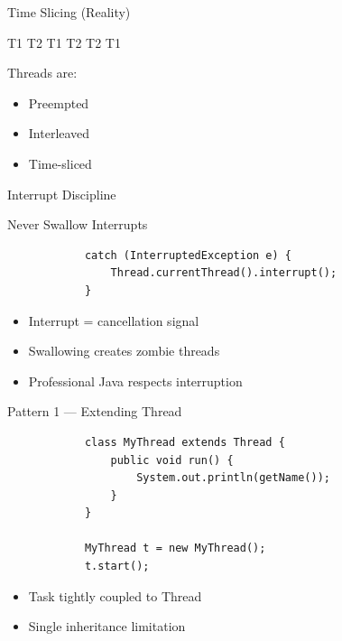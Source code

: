 \documentclass[aspectratio=169,11pt]{beamer}
\begin{document}
	\begin{frame}{Time Slicing (Reality)}
		\begin{center}
			\Huge
			T1 \quad T2 \quad T1 \quad T2 \quad T2 \quad T1
		\end{center}
		
		\vspace{5mm}
		
		Threads are:
		\begin{itemize}
			\item Preempted
			\item Interleaved
			\item Time-sliced
		\end{itemize}
	\end{frame}
	
	\begin{frame}[fragile]{Interrupt Discipline}
		\begin{block}{Never Swallow Interrupts}
		\end{block}
		
		\begin{lstlisting}
			catch (InterruptedException e) {
				Thread.currentThread().interrupt();
			}
		\end{lstlisting}
		
		\begin{itemize}
			\item Interrupt = cancellation signal
			\item Swallowing creates zombie threads
			\item Professional Java respects interruption
		\end{itemize}
	\end{frame}
	
	\begin{frame}[fragile]{Pattern 1 — Extending Thread}
		\begin{lstlisting}
			class MyThread extends Thread {
				public void run() {
					System.out.println(getName());
				}
			}
			
			MyThread t = new MyThread();
			t.start();
		\end{lstlisting}
		
		\begin{itemize}
			\item Task tightly coupled to Thread
			\item Single inheritance limitation
		\end{itemize}
	\end{frame}
	
\end{document}
